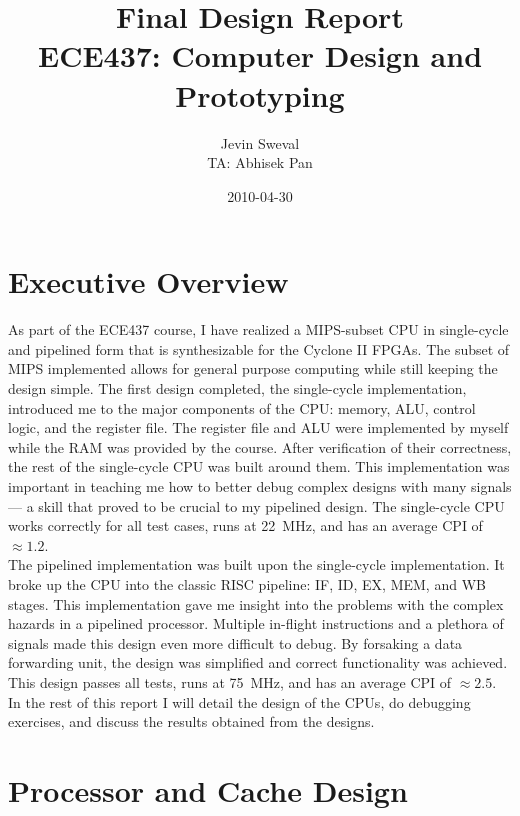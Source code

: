 \documentclass[12pt]{article}
\title{Final Design Report \\
ECE437: Computer Design and Prototyping}
\author{Jevin Sweval \\
        TA: Abhisek Pan}
\date{2010-04-30}
\begin{document}
  \maketitle
  \newpage

\section{Executive Overview}
As part of the ECE437 course, I have realized a MIPS-subset CPU in single-cycle and pipelined form that is synthesizable for the Cyclone II FPGAs. The subset of MIPS implemented allows for general purpose computing while still keeping the design simple. The first design completed, the single-cycle implementation, introduced me to the major components of the CPU: memory, ALU, control logic, and the register file. The register file and ALU were implemented by myself while the RAM was provided by the course. After verification of their correctness, the rest of the single-cycle CPU was built around them. This implementation was important in teaching me how to better debug complex designs with many signals --- a skill that proved to be crucial to my pipelined design. The single-cycle CPU works correctly for all test cases, runs at 22~MHz, and has an average CPI of $\approx 1.2$.\\

The pipelined implementation was built upon the single-cycle implementation. It broke up the CPU into the classic RISC pipeline: IF, ID, EX, MEM, and WB stages. This implementation gave me insight into the problems with the complex hazards in a pipelined processor. Multiple in-flight instructions and a plethora of signals made this design even more difficult to debug. By forsaking a data forwarding unit, the design was simplified and correct functionality was achieved. This design passes all tests, runs at 75~MHz, and has an average CPI of $\approx 2.5$. In the rest of this report I will detail the design of the CPUs, do debugging exercises, and discuss the results obtained from the designs.\\

\newpage
\section{Processor and Cache Design}
\end{document}
